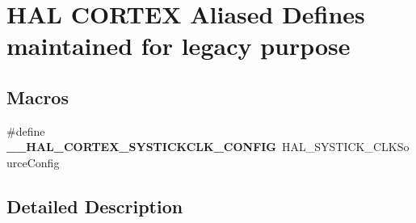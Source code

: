 \hypertarget{group___h_a_l___c_o_r_t_e_x___aliased___defines}{\section{H\-A\-L C\-O\-R\-T\-E\-X Aliased Defines maintained for legacy purpose}
\label{group___h_a_l___c_o_r_t_e_x___aliased___defines}
}
\subsection*{Macros}
\begin{DoxyCompactItemize}
\item 
\hypertarget{group___h_a_l___c_o_r_t_e_x___aliased___defines_gac1aca630ce4888aa3febf24db3d9ce45}{\#define {\bfseries \-\_\-\-\_\-\-H\-A\-L\-\_\-\-C\-O\-R\-T\-E\-X\-\_\-\-S\-Y\-S\-T\-I\-C\-K\-C\-L\-K\-\_\-\-C\-O\-N\-F\-I\-G}~H\-A\-L\-\_\-\-S\-Y\-S\-T\-I\-C\-K\-\_\-\-C\-L\-K\-Source\-Config}\label{group___h_a_l___c_o_r_t_e_x___aliased___defines_gac1aca630ce4888aa3febf24db3d9ce45}

\end{DoxyCompactItemize}


\subsection{Detailed Description}
